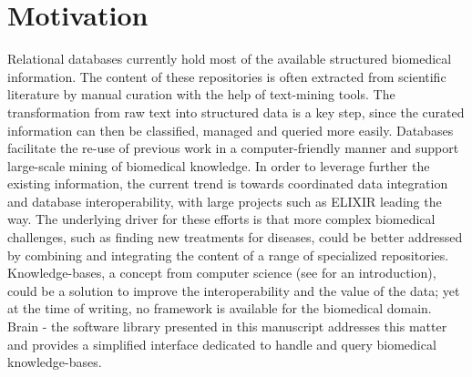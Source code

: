 \documentclass{bioinfo}
\begin{document}
\section{Motivation}
Relational databases currently hold most of the available structured biomedical information. The content of these repositories is often
extracted from scientific literature by manual curation with the help of text-mining tools. The transformation from raw text into
structured data is a key step, since the curated information can then be classified, managed and queried more easily. Databases facilitate
the re-use of previous work in a computer-friendly manner and support large-scale mining of
biomedical knowledge. In order to leverage further 
the existing information, the current trend is towards coordinated data integration and database interoperability, 
with large projects such as ELIXIR \citep{Crosswell2012} leading the way.
The underlying driver for these efforts is that more complex biomedical challenges, such as finding new treatments for diseases, could be better 
addressed by combining and integrating the content of a range of specialized repositories. 
Knowledge-bases, a concept from computer science (see \citealp{Krotzsch2012} for an introduction), 
could be a solution to improve the interoperability and the value of the data; yet at the time of writing, 
no framework is available for 
the biomedical domain. Brain - the software library presented in this manuscript addresses this matter and provides a simplified 
interface dedicated to handle and query biomedical knowledge-bases.
\end{document}
